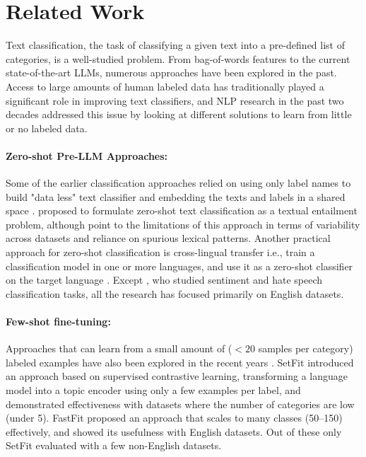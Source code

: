 \section{Related Work}
\label{sec:related}
Text classification, the task of classifying a given text into a pre-defined list of categories, is a well-studied problem. From bag-of-words features to the current state-of-the-art LLMs, numerous approaches have been explored in the past. Access to large amounts of human labeled data has traditionally played a significant role in improving text classifiers, and NLP research in the past two decades addressed this issue by looking at different solutions to learn from little or no labeled data.

\paragraph{Zero-shot Pre-LLM Approaches: }Some of the earlier classification approaches relied on using only label names to build "data less" text classifier \cite{liu2004text,li2018pseudo,meng2020text,ye2020zero,gera-etal-2022-zero} and embedding the texts and labels in a shared space \cite{song2014dataless,luo2021don,chu2021unsupervised,sarkar-etal-2022-exploring,gao-etal-2023-benefits,wang-etal-2023-pesco}. \citet{yin2019benchmarking} proposed to formulate zero-shot text classification as a textual entailment problem, although \citet{ma2021issues} point to the limitations of this approach in terms of variability across datasets and reliance on spurious lexical patterns. Another practical approach for zero-shot classification is cross-lingual transfer i.e., train a classification model in one or more languages, and use it as a zero-shot classifier on the target language \cite{wang-banko-2021-practical}. Except \citep{wang-banko-2021-practical}, who studied sentiment and hate speech classification tasks, all the research has  focused primarily on English datasets. 

\paragraph{Few-shot fine-tuning: } Approaches that can learn from a small amount of ($<20$ samples per category) labeled examples have also been explored in the recent years \cite{schick2020automatically,dopierre-etal-2021-neural,ohashi2021distinct,zhang-etal-2022-prompt-based}. SetFit \cite{tunstall2022efficient} introduced an approach based on supervised contrastive learning, transforming a language model into a topic encoder using only a few examples per label, and demonstrated effectiveness with datasets where the number of categories are low (under 5). FastFit \cite{yehudai2024fastfit} proposed an approach that scales to many classes (50--150) effectively, and showed its usefulness with English datasets. Out of these only SetFit evaluated with a few non-English datasets. %

